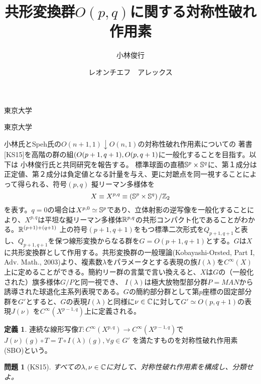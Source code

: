 \documentclass[12pt]{msjproc} %
\newtheorem{question}{問題}
\theoremstyle{definition}
\newtheorem{definition}{定義}
\theoremstyle{remark}
\begin{document}
\title{共形変換群$O(p,q)$に関する対称性破れ作用素}

  \author{小林俊行}{東京大学}
  \author{レオンチエフ　アレックス}{東京大学}




  \maketitle

小林氏とSpeh氏の$O(n+1,1)\downarrow O(n,1)$の対称性破れ作用素についての
著書[KS15]\footnotemark[\ref{note1}]を高階の群の組$\left(O(p+1,q+1),O(p,q+1\right)$に一般化することを目指す。以下は
小林俊行氏と共同研究を報告する。
標準球面の直積$\mathbb{S}^p\times\mathbb{S}^q$に、第１成分は正定値、第２成分は負定値となる計量を与え、更に対蹠点を同一視することによって得られる、符号$(p,q)$	擬リーマン多様体を\vspace{-0.6cm}
\begin{equation*}
	X\equiv X^{p,q}\equiv \left( \Sp^p\times\Sp^q \right)/\Z_2
	\vspace{-0.2cm}
\end{equation*}
を表す。$q=0$の場合は$X^{p,0}\simeq \mathbb{S}^p$であり、立体射影の逆写像を一般化することにより、$X^{p,q}$は平坦な擬リーマン多様体$\mathbb{R}^{p,q}$の共形コンパクト化であることがわかる。$\mathbb{R}^{\left( p+ 1\right)+\left( q+ 1\right)}$
上の符号$(p+1,q+1)$をもつ標準二次形式を$Q_{p+1,q+1}$と表し、$Q_{p+1,q+1}$を保つ線形変換からなる群を$G=O(p+1,q+1)$とする。$G$は$X$に共形変換群として作用する。共形変換群の一般理論(Kobayashi-Orsted, Part I, Adv. Math., 
2003)より、複素数$\lambda$をパラメータとする表現の族$I(\lambda)$を$C^\infty(X)$上に定めることができる。簡約リー群の言葉で言い換えると、$X$は$G$の（一般化された）旗多様体$G/P$と同一視でき、
$I(\lambda)$は極大放物型部分群$P=MAN$から誘導された球退化主系列表現である。$G$の簡約部分群として第$p$座標の固定部分群を$G'$とすると、$G$の表現$I(\lambda)$と同様に$\nu\in\mathbb{C}$に対して$G'\simeq O(p,q+1)$の表現$J(\nu)$
を$C^\infty(X^{p-1,q})$上に定義される。
\begin{definition}
	連続な線形写像$T:C^\infty(X^{p,q})\to C^\infty(X^{p-1,q})$で
		$J(\nu)(g)\circ T=T\circ I(\lambda)(g),\forall g\in G'$
を満たすものを対称性破れ作用素(SBO)という。
\end{definition}
\begin{question}[KS15]
	すべての$\lambda,\nu\in\mathbb{C}$に対して、対称性破れ作用素を構成し、分類せよ。\vspace{-0.2cm}
\end{question}
\end{document}
